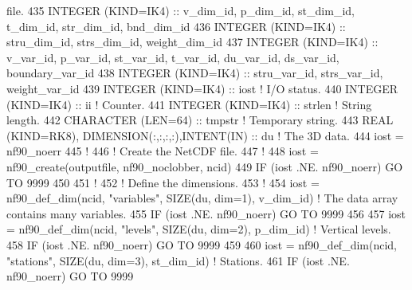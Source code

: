 \begin{DoxyCode}
{       file.}
435     \textcolor{keywordtype}{INTEGER (KIND=IK4)}          :: v\_dim\_id, p\_dim\_id, st\_dim\_id, t\_dim\_id, str\_dim\_id, bnd\_dim\_id
436     \textcolor{keywordtype}{INTEGER (KIND=IK4)}          :: stru\_dim\_id, strs\_dim\_id, weight\_dim\_id
437     \textcolor{keywordtype}{INTEGER (KIND=IK4)}          :: v\_var\_id, p\_var\_id, st\_var\_id, t\_var\_id, du\_var\_id, ds\_var\_id, 
      boundary\_var\_id
438     \textcolor{keywordtype}{INTEGER (KIND=IK4)}          :: stru\_var\_id, strs\_var\_id, weight\_var\_id
439     \textcolor{keywordtype}{INTEGER (KIND=IK4)}          :: iost                                                 \textcolor{comment}{! I/O status.}
440     \textcolor{keywordtype}{INTEGER (KIND=IK4)}          :: ii                                                   \textcolor{comment}{! Counter.}
441     \textcolor{keywordtype}{INTEGER (KIND=IK4)}          :: strlen                                               \textcolor{comment}{! String length.}
442     \textcolor{keywordtype}{CHARACTER (LEN=64)}          :: tmpstr                                               \textcolor{comment}{! Temporary string.}
443     \textcolor{keywordtype}{REAL (KIND=RK8)}, \textcolor{keywordtype}{DIMENSION(:,:,:,:)},\textcolor{keywordtype}{INTENT(IN)}                                 :: du           \textcolor{comment}{! The 3D
       data.}
444     iost    = nf90\_noerr
445     \textcolor{comment}{!}
446     \textcolor{comment}{! Create the NetCDF file.}
447     \textcolor{comment}{!}
448     iost    = nf90\_create(outputfile, nf90\_noclobber, ncid)
449     \textcolor{keywordflow}{IF} (iost .NE. nf90\_noerr) \textcolor{keywordflow}{GO TO} 9999
450 
451     \textcolor{comment}{!}
452     \textcolor{comment}{! Define the dimensions.}
453     \textcolor{comment}{!}
454     iost    = nf90\_def\_dim(ncid, \textcolor{stringliteral}{"variables"}, \textcolor{keyword}{SIZE}(du, dim=1), v\_dim\_id)    \textcolor{comment}{! The data array contains many
       variables.}
455     \textcolor{keywordflow}{IF} (iost .NE. nf90\_noerr) \textcolor{keywordflow}{GO TO} 9999
456 
457     iost    = nf90\_def\_dim(ncid, \textcolor{stringliteral}{"levels"}, \textcolor{keyword}{SIZE}(du, dim=2), p\_dim\_id)       \textcolor{comment}{! Vertical levels.}
458     \textcolor{keywordflow}{IF} (iost .NE. nf90\_noerr) \textcolor{keywordflow}{GO TO} 9999
459 
460     iost    = nf90\_def\_dim(ncid, \textcolor{stringliteral}{"stations"}, \textcolor{keyword}{SIZE}(du, dim=3), st\_dim\_id)    \textcolor{comment}{! Stations.}
461     \textcolor{keywordflow}{IF} (iost .NE. nf90\_noerr) \textcolor{keywordflow}{GO TO} 9999

\end{DoxyCode}
